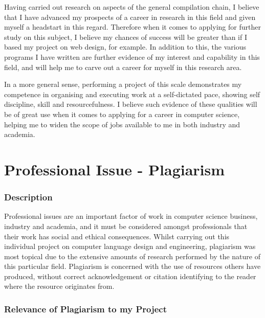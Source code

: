 \documentclass[a4paper, 11pt]{article}
\begin{document}
Having carried out research on aspects of the general compilation chain, I believe that I have advanced my prospects of a career in research in this field and given myself a headstart in this regard. Therefore when it comes to applying for further study on this subject, I believe my chances of success will be greater than if I based my project on web design, for example. In addition to this, the various programs I have written are further evidence of my interest and capability in this field, and will help me to carve out a career for myself in this research area.

In a more general sense, performing a project of this scale demonstrates my competence in organising and executing work at a self-dictated pace, showing self discipline, skill and resourcefulness. I believe such evidence of these qualities will be of great use when it comes to applying for a career in computer science, helping me to widen the scope of jobs available to me in both industry and academia.
 
\newpage\part{Professional Issue - Plagiarism}
\section{Description}
Professional issues are an important factor of work in computer science business, industry and academia, and it must be considered amongst professionals that their work has social and ethical consequences. Whilst carrying out this individual project on computer language design and engineering, plagiarism was most topical due to the extensive amounts of research performed by the nature of this particular field. Plagiarism is concerned with the use of resources others have produced, without correct acknowledgement or citation identifying to the reader where the resource originates from.

\section{Relevance of Plagiarism to my Project}
\end{document}

